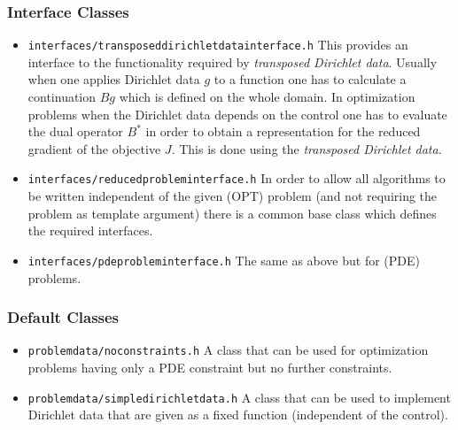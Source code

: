 \subsubsection{Interface Classes}
\begin{itemize}
  \item \texttt{interfaces/transposeddirichletdatainterface.h} This provides an interface to 
    the functionality required by {\em transposed Dirichlet data}. Usually when one applies Dirichlet 
    data $g$ to a function one has to calculate a continuation $Bg$ which is defined on the whole domain.
    In optimization problems when the Dirichlet data depends on the control one has to evaluate the 
    dual operator $B^*$ in order to obtain a representation for the reduced gradient of the objective $J$.
    This is done using the {\em transposed Dirichlet data}.
  \item \texttt{interfaces/reducedprobleminterface.h} In order to allow all algorithms to be written independent
    of the given (OPT) problem 
    (and not requiring the problem as template argument) there is a common base class which 
    defines the required interfaces. 
  \item \texttt{interfaces/pdeprobleminterface.h} The same as above but for (PDE) problems.
\end{itemize}

\subsubsection{Default Classes}
\begin{itemize}
  \item \texttt{problemdata/noconstraints.h} A class that can be used for optimization problems 
    having only a PDE constraint but no further constraints.
  \item \texttt{problemdata/simpledirichletdata.h} A class that can be used to implement Dirichlet
    data that are given as a fixed function (independent of the control).
  \end{itemize}


